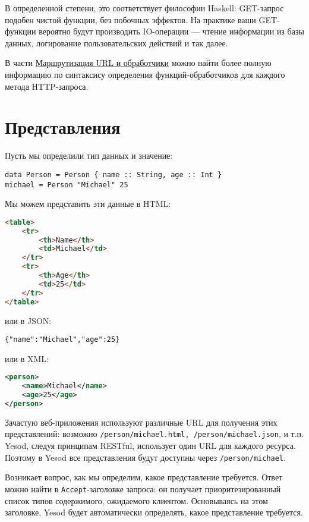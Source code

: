 В определенной степени, это соответствует философии Haskell: GET-запрос подобен чистой
функции, без побочных эффектов. На практике ваши GET-функции вероятно будут производить
IO-операции --- чтение информации из базы данных, логирование пользовательских действий и
так далее.

В части \hyperref[chap:routing]{Маршрутизация URL и обработчики} можно найти более
полную информацию по
синтаксису определения функций-обработчиков для каждого метода HTTP-запроса.

\section{Представления}

Пусть мы определили тип данных и значение:

\begin{lstlisting}
data Person = Person { name :: String, age :: Int }
michael = Person "Michael" 25
\end{lstlisting}

Мы можем представить эти данные в HTML:
\begin{lstlisting}[language=HTML]
 <table>
    <tr>
        <th>Name</th>
        <td>Michael</td>
    </tr>
    <tr>
        <th>Age</th>
        <td>25</td>
    </tr>
</table>
\end{lstlisting}

или в JSON:

\begin{lstlisting}
{"name":"Michael","age":25}
\end{lstlisting}

или в XML:
\begin{lstlisting}[language=XML]
<person>
    <name>Michael</name>
    <age>25</age>
</person>
\end{lstlisting}

Зачастую веб-приложения используют различные URL для получения этих представлений: возможно \lstinline'/person/michael.html, /person/michael.json', и т.п. Yesod, следуя принципам RESTful, использует один URL для каждого ресурса. Поэтому в Yesod все представления будут доступны через \lstinline'/person/michael'.

Возникает вопрос, как мы определим, какое представление требуется. Ответ можно найти в
\verb*|Accept|-заголовке запроса: он получает приоритезированный список типов содержимого,
ожидаемого клиентом. Основываясь на этом заголовке, Yesod будет автоматически определять,
какое представление требуется.

